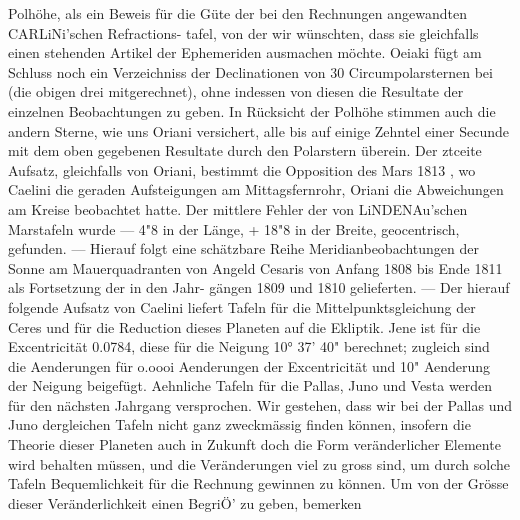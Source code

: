 \documentclass[12pt,a4paper]{article}
\begin{document}
Polhöhe, als ein Beweis für die Güte der bei den Rechnungen angewandten CARLiNi'schen Refractions-\newline
tafel, von der wir wünschten, dass sie gleichfalls einen stehenden Artikel der Ephemeriden ausmachen\newline
möchte. Oeiaki fügt am Schluss noch ein Verzeichniss der Declinationen von 30 Circumpolarsternen bei\newline
(die obigen drei mitgerechnet), ohne indessen von diesen die Resultate der einzelnen Beobachtungen zu\newline
geben. In Rücksicht der Polhöhe stimmen auch die andern Sterne, wie uns Oriani versichert, alle bis\newline
auf einige Zehntel einer Secunde mit dem oben gegebenen Resultate durch den Polarstern überein.\newline
Der ztceite Aufsatz, gleichfalls von Oriani, bestimmt die Opposition des Mars 1813 , wo Caelini\newline
die geraden Aufsteigungen am Mittagsfernrohr, Oriani die Abweichungen am Kreise beobachtet hatte.\newline
Der mittlere Fehler der von LiNDENAu'schen Marstafeln wurde --- 4"8 in der Länge, + 18"8 in der Breite,\newline
geocentrisch, gefunden. --- Hierauf folgt eine schätzbare Reihe Meridianbeobachtungen der Sonne am\newline
Mauerquadranten von Angeld Cesaris von Anfang 1808 bis Ende 1811 als Fortsetzung der in den Jahr-\newline
gängen 1809 und 1810 gelieferten. --- Der hierauf folgende Aufsatz von Caelini liefert Tafeln für die\newline
Mittelpunktsgleichung der Ceres und für die Reduction dieses Planeten auf die Ekliptik. Jene ist für\newline
die Excentricität 0.0784, diese für die Neigung 10° 37' 40" berechnet; zugleich sind die Aenderungen für\newline
o.oooi Aenderungen der Excentricität und 10" Aenderung der Neigung beigefügt. Aehnliche Tafeln\newline
für die Pallas, Juno und Vesta werden für den nächsten Jahrgang versprochen. Wir gestehen, dass\newline
wir bei der Pallas und Juno dergleichen Tafeln nicht ganz zweckmässig finden können, insofern die\newline
Theorie dieser Planeten auch in Zukunft doch die Form veränderlicher Elemente wird behalten müssen,\newline
und die Veränderungen viel zu gross sind, um durch solche Tafeln Bequemlichkeit für die Rechnung\newline
gewinnen zu können. Um von der Grösse dieser Veränderlichkeit einen BegriÖ' zu geben, bemerken\newline
\end{document}
